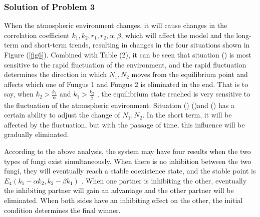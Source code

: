 \subsubsection{Solution of Problem 3}

When the atmospheric environment changes, it will cause changes in the correlation coefficient $k_{1},k_{2},r_{1},r_{2},\alpha,\beta$, which will affect the model and the long-term and short-term trends, resulting in changes in the four situations shown in Figure (\ref{fig6}). Combined with Table (2), it can be seen that situation (\uppercase\expandafter{}) is most sensitive to the rapid fluctuation of the environment, and the rapid fluctuation determines the direction in which $N_{1},N_{2}$ moves from the equilibrium point and affects which one of Fungus 1 and Fungus 2 is eliminated in the end. That is to say, when $k_{2}>\frac{k_{1}}{\alpha}$ and $k_{1}>\frac{k_{2}}{\beta}$ , the equilibrium state reached is very sensitive to the fluctuation of the atmospheric environment. Situation (\uppercase\expandafter{}) (\uppercase\expandafter{})and (\uppercase\expandafter{}) has a certain ability to adjust the change of $N_{1},N_{2}$. In the short term, it will be affected by the fluctuation, but with the passage of time, this influence will be gradually eliminated.

According to the above analysis, the system may have four results when the two types of fungi exist simultaneously. When there is no inhibition between the two fungi, they will eventually reach a stable coexistence state, and the stable point is $E_{4}(k_{1}-\alpha k_{2},k_{2}-\beta k_{1})$ . When one partner is inhibiting the other, eventually the inhibiting partner will gain an advantage and the other partner will be eliminated. When both sides have an inhibiting effect on the other, the initial condition determines the final winner.
